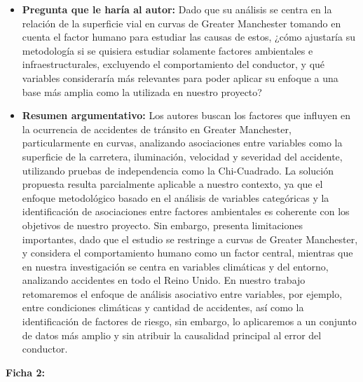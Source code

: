 \documentclass[12pt]{article}
\begin{document}
\begin{itemize}
	\item \textbf{Pregunta que le haría al autor:} Dado que su análisis se centra en la relación de la superficie vial en curvas de Greater Manchester tomando en cuenta el factor humano para estudiar las causas de estos, ¿cómo ajustaría su metodología si se quisiera estudiar solamente factores ambientales e infraestructurales, excluyendo el comportamiento del conductor, y qué variables consideraría más relevantes para poder aplicar su enfoque a una base más amplia como la utilizada en nuestro proyecto?
    
	\item \textbf{Resumen argumentativo:} Los autores buscan los factores que influyen en la ocurrencia de accidentes de tránsito en Greater Manchester, particularmente en curvas, analizando asociaciones entre variables como la superficie de la carretera, iluminación, velocidad y severidad del accidente, utilizando pruebas de independencia como la Chi-Cuadrado.
    La solución propuesta resulta parcialmente aplicable a nuestro contexto, ya que el enfoque metodológico basado en el análisis de variables categóricas y la identificación de asociaciones entre factores ambientales es coherente con los objetivos de nuestro proyecto. Sin embargo, presenta limitaciones importantes, dado que el estudio se restringe a curvas de Greater Manchester, y considera el comportamiento humano como un factor central, mientras que en nuestra investigación se centra en variables climáticas y del entorno, analizando accidentes en todo el Reino Unido. En nuestro trabajo retomaremos el enfoque de análisis asociativo entre variables, por ejemplo, entre condiciones climáticas y cantidad de accidentes, así como la identificación de factores de riesgo, sin embargo, lo aplicaremos a un conjunto de datos más amplio y sin atribuir la causalidad principal al error del conductor.\\
	\end{itemize} 
	
\textbf{Ficha 2:}
\end{document}

